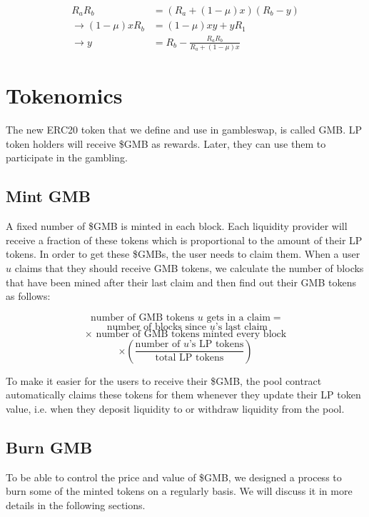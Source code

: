 \documentclass{article}
\begin{document}
\begin{align*}
    R_a R_b &= (R_a + (1 - \mu)x)(R_b - y) \\
    \to (1 - \mu)xR_b &= (1 - \mu)xy + yR_1 \\
    \to y &= R_b - \frac{R_aR_b}{R_a + (1 - \mu)x}
\end{align*}


\section{Tokenomics}

The new ERC20 token that we define and use in gambleswap, is called GMB. 
LP token holders will receive \$GMB as rewards. Later, they can use them to participate in the gambling.

\subsection{Mint GMB}

A fixed number of \$GMB is minted in each block. Each liquidity provider will receive a fraction of these tokens which is proportional to the amount of their LP tokens. In order to get these \$GMBs, the user needs to claim them. When a user $u$ claims that they should receive GMB tokens, we calculate the number of blocks that have been mined after their last claim and then find out their GMB tokens as follows:

$$
\text{ number of GMB tokens } u \text{ gets in a claim} =
$$
$$
\text{ number of blocks since } u \text{'s last claim}
$$
$$
\times \text{ number of GMB tokens minted every block}
$$
$$\times (\frac{\text{number of } u \text{'s LP tokens}}{\text{total LP tokens}})
$$

To make it easier for the users to receive their \$GMB, the pool contract automatically claims these tokens for them whenever they update their LP token value, i.e. when they deposit liquidity to or withdraw liquidity from the pool.


\subsection{Burn GMB}
To be able to control the price and value of \$GMB, we designed a process to burn some of the minted tokens on a regularly basis. We will discuss it in more details in the following sections.
\end{document}
